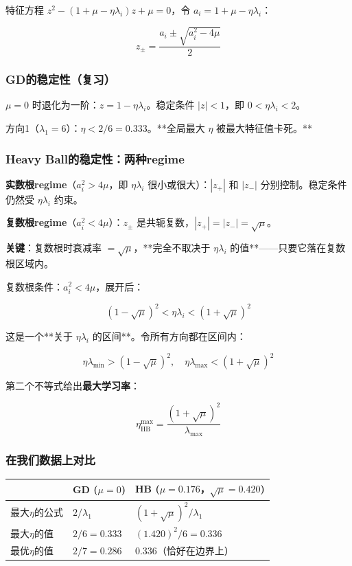 \documentclass[12pt,a4paper]{article}
\begin{document}
特征方程 $z^2 - (1+\mu-\eta\lambda_i)z + \mu = 0$，令 $a_i = 1+\mu-\eta\lambda_i$：


\[z_\pm = \frac{a_i \pm \sqrt{a_i^2 - 4\mu}}{2}\]


\subsubsection{GD的稳定性（复习）}

$\mu = 0$ 时退化为一阶：$z = 1 - \eta\lambda_i$。稳定条件 $|z| < 1$，即 $0 < \eta\lambda_i < 2$。

方向1（$\lambda_1=6$）：$\eta < 2/6 = 0.333$。**全局最大 $\eta$ 被最大特征值卡死。**


\subsubsection{Heavy Ball的稳定性：两种regime}

\textbf{实数根regime}（$a_i^2 > 4\mu$，即 $\eta\lambda_i$ 很小或很大）：$|z_+|$ 和 $|z_-|$ 分别控制。稳定条件仍然受 $\eta\lambda_i$ 约束。

\textbf{复数根regime}（$a_i^2 < 4\mu$）：$z_\pm$ 是共轭复数，$|z_+| = |z_-| = \sqrt\mu$。

\textbf{关键}：复数根时衰减率 $= \sqrt\mu$，**完全不取决于 $\eta\lambda_i$ 的值**——只要它落在复数根区域内。

复数根条件：$a_i^2 < 4\mu$，展开后：


\[(1-\sqrt\mu)^2 < \eta\lambda_i < (1+\sqrt\mu)^2\]

这是一个**关于 $\eta\lambda_i$ 的区间**。令所有方向都在区间内：


\[\eta\lambda_{\min} > (1-\sqrt\mu)^2, \quad \eta\lambda_{\max} < (1+\sqrt\mu)^2\]

第二个不等式给出\textbf{最大学习率}：


\[\eta^{\max}_{\text{HB}} = \frac{(1+\sqrt\mu)^2}{\lambda_{\max}}\]


\subsubsection{在我们数据上对比}






\begin{center}\small
\begin{longtable}{|l|l|l|}
\hline
 & GD ($\mu=0$) & HB ($\mu=0.176$，$\sqrt\mu=0.420$) \\
\hline
最大$\eta$的公式 & $2/\lambda_1$ & $(1+\sqrt\mu)^2/\lambda_1$ \\
最大$\eta$的值 & $2/6 = 0.333$ & $(1.420)^2/6 = 0.336$ \\
最优$\eta$的值 & $2/7 = 0.286$ & $0.336$（恰好在边界上） \\
\hline
\end{longtable}
\end{center}
\end{document}
